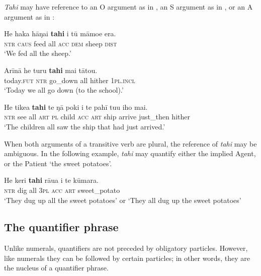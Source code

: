 \textit{Tahi} may have reference to an O argument as in , an S argument as in , or an A argument as in :

\ea\label{ex:4.117}
\gll He haka hāŋai \textbf{tahi} i tū māmoe era. \\
\textsc{ntr} \textsc{caus} feed all \textsc{acc} \textsc{dem} sheep \textsc{dist} \\

\glt 
‘We fed all the sheep.’ \textstyleExampleref{[R131.008]} 
\z

\ea\label{ex:4.118}
\gll {\ꞌ}Arīnā he turu \textbf{tahi} mai tātou. \\
today.\textsc{fut} \textsc{ntr} go\_down all hither \textsc{1pl.incl} \\

\glt 
‘Today we all go down (to the school).’ \textstyleExampleref{[R315.384]} 
\z

\ea\label{ex:4.119}
\gll He tike{\ꞌ}a \textbf{tahi} te ŋā poki i te pahī tu{\ꞌ}u iho mai. \\
\textsc{ntr} see all \textsc{art} \textsc{pl} child \textsc{acc} \textsc{art} ship arrive just\_then hither \\

\glt
‘The children all saw the ship that had just arrived.’ \textstyleExampleref{[Notes]}
\z

When both arguments of a transitive verb are plural, the reference of \textit{tahi} may be ambiguous. In the following example, \textit{tahi} may quantify either the implied Agent, or the Patient ‘the sweet potatoes’.

\ea\label{ex:4.120}
\gll He keri \textbf{tahi} rāua i te kūmara. \\
\textsc{ntr} dig all \textsc{3pl} \textsc{acc} \textsc{art} sweet\_potato \\

\glt 
‘They dug up all the sweet potatoes’ or ‘They all dug up the sweet potatoes’ \textstyleExampleref{[Notes]}
\z

\subsection{The quantifier phrase}\label{sec:4.4.10}
Unlike numerals, quantifiers are not preceded by obligatory particles. However, like numerals they can be followed by certain particles; in other words, they are the nucleus of a quantifier phrase.

